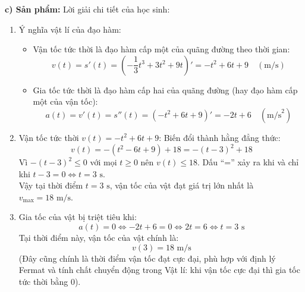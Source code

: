\documentclass[12pt, a4paper]{article}
\begin{document}
\noindent \textbf{c) Sản phẩm:}
Lời giải chi tiết của học sinh:
\begin{enumerate}[label=\alph*)]
    \item Ý nghĩa vật lí của đạo hàm:
    \begin{itemize}
        \item Vận tốc tức thời là đạo hàm cấp một của quãng đường theo thời gian:
        $$v(t) = s'(t) = \left(-\dfrac{1}{3}t^3 + 3t^2 + 9t\right)' = -t^2 + 6t + 9 \quad (\text{m/s})$$
        \item Gia tốc tức thời là đạo hàm cấp hai của quãng đường (hay đạo hàm cấp một của vận tốc):
        $$a(t) = v'(t) = s''(t) = (-t^2 + 6t + 9)' = -2t + 6 \quad (\text{m/s}^2)$$
    \end{itemize}

    \item Vận tốc tức thời $v(t) = -t^2 + 6t + 9$:
    Biến đổi thành hằng đẳng thức:
    $$v(t) = -(t^2 - 6t + 9) + 18 = -(t - 3)^2 + 18$$
    Vì $-(t - 3)^2 \le 0$ với mọi $t \ge 0$ nên $v(t) \le 18$.
    Dấu ``='' xảy ra khi và chỉ khi $t - 3 = 0 \iff t = 3\text{ s}$.\\
    Vậy tại thời điểm $t = 3\text{ s}$, vận tốc của vật đạt giá trị lớn nhất là $v_{\max} = 18\text{ m/s}$.

    \item Gia tốc của vật bị triệt tiêu khi:
    $$a(t) = 0 \iff -2t + 6 = 0 \iff 2t = 6 \iff t = 3\text{ s}$$
    Tại thời điểm này, vận tốc của vật chính là:
    $$v(3) = 18\text{ m/s}$$
    (Đây cũng chính là thời điểm vận tốc đạt cực đại, phù hợp với định lý Fermat và tính chất chuyển động trong Vật lí: khi vận tốc cực đại thì gia tốc tức thời bằng 0).
\end{enumerate}
\end{document}
